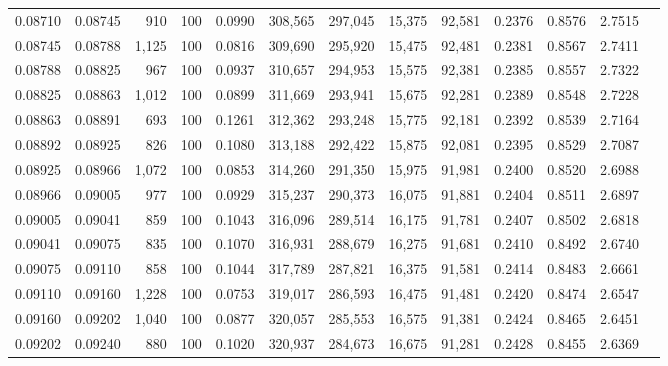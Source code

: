 \begin{tabular}{rrrrrrrrrrrrr}
0.08710 & 0.08745 &   910 & 100 &                                     0.0990 & 308,565 & 297,045 &  15,375 &  92,581 & 0.2376 & 0.8576 & 2.7515 \\
0.08745 & 0.08788 & 1,125 & 100 &                                     0.0816 & 309,690 & 295,920 &  15,475 &  92,481 & 0.2381 & 0.8567 & 2.7411 \\
0.08788 & 0.08825 &   967 & 100 &                                     0.0937 & 310,657 & 294,953 &  15,575 &  92,381 & 0.2385 & 0.8557 & 2.7322 \\
0.08825 & 0.08863 & 1,012 & 100 &                                     0.0899 & 311,669 & 293,941 &  15,675 &  92,281 & 0.2389 & 0.8548 & 2.7228 \\
0.08863 & 0.08891 &   693 & 100 &                                     0.1261 & 312,362 & 293,248 &  15,775 &  92,181 & 0.2392 & 0.8539 & 2.7164 \\
0.08892 & 0.08925 &   826 & 100 &                                     0.1080 & 313,188 & 292,422 &  15,875 &  92,081 & 0.2395 & 0.8529 & 2.7087 \\
0.08925 & 0.08966 & 1,072 & 100 &                                     0.0853 & 314,260 & 291,350 &  15,975 &  91,981 & 0.2400 & 0.8520 & 2.6988 \\
0.08966 & 0.09005 &   977 & 100 &                                     0.0929 & 315,237 & 290,373 &  16,075 &  91,881 & 0.2404 & 0.8511 & 2.6897 \\
0.09005 & 0.09041 &   859 & 100 &                                     0.1043 & 316,096 & 289,514 &  16,175 &  91,781 & 0.2407 & 0.8502 & 2.6818 \\
0.09041 & 0.09075 &   835 & 100 &                                     0.1070 & 316,931 & 288,679 &  16,275 &  91,681 & 0.2410 & 0.8492 & 2.6740 \\
0.09075 & 0.09110 &   858 & 100 &                                     0.1044 & 317,789 & 287,821 &  16,375 &  91,581 & 0.2414 & 0.8483 & 2.6661 \\
0.09110 & 0.09160 & 1,228 & 100 &                                     0.0753 & 319,017 & 286,593 &  16,475 &  91,481 & 0.2420 & 0.8474 & 2.6547 \\
0.09160 & 0.09202 & 1,040 & 100 &                                     0.0877 & 320,057 & 285,553 &  16,575 &  91,381 & 0.2424 & 0.8465 & 2.6451 \\
0.09202 & 0.09240 &   880 & 100 &                                     0.1020 & 320,937 & 284,673 &  16,675 &  91,281 & 0.2428 & 0.8455 & 2.6369 \\

\end{tabular}
